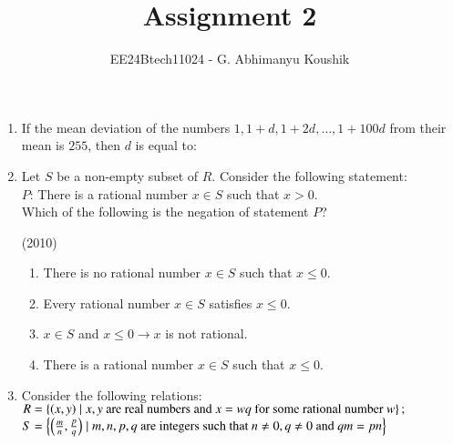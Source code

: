 \documentclass[journal,12pt,twocolumn]{IEEEtran}
\theoremstyle{remark}
\begin{document}
\title{Assignment 2}
\author{EE24Btech11024 - G. Abhimanyu Koushik}
\maketitle
\newpage
\bigskip
\renewcommand{\thefigure}{\theenumi}
\renewcommand{\thetable}{\theenumi}
\begin{enumerate}
    \item If the mean deviation of the numbers $1, 1+d, 1+2d, \dots, 1+100d$ from their mean is $255$, then $d$ is equal to:
    
    \hfill{}
    \begin{enumerate}[label=(\alph*)]
    \end{enumerate}
    
    \item Let $S$ be a non-empty subset of $R$. Consider the following statement:\\
    $P$: There is a rational number $x \in S$ such that $x>0$.\\
    Which of the following is the negation of statement $P$?
    
    \hfill{(2010)}
    \begin{enumerate}[label=(\alph*)]
    \item There is no rational number $x \in S$ such that $x \leq 0$.
    \item Every rational number $x \in S$ satisfies $x \leq 0$.
    \item $x \in S$ and $x \leq 0 \longrightarrow x$ is not rational.
    \item There is a rational number $x \in S$ such that $x \leq 0$.
    \end{enumerate}
    
    \item Consider the following relations: \\
    $R = \left\{\left(x, y\right) \mid x,y \text{ are real numbers and } x = wq \text{ for some rational number } w\right\};$ \\
    $S = \left\{\left(\frac{m}{n}, \frac{p}{q}\right) \mid m, n, p, q \text{ are integers such that } n \neq 0, q \neq 0 \text{ and } qm = pn\right\}$
    

\end{enumerate}
\end{document}
